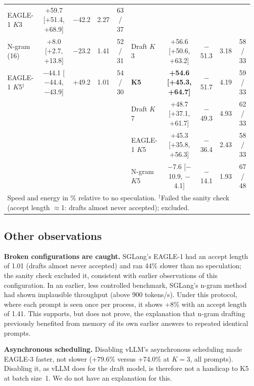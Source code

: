 \documentclass[conference]{IEEEtran}
\begin{document}
\begin{table}[t]
{\begin{tabular}{lcccc@{\hskip 18pt}lcccc}
EAGLE-1 $K$3 & +59.7 [+51.4, +68.9] & $-$42.2 & 2.27 & 63 / 37 \\
N-gram (16) & +8.0 [+2.7, +13.8] & $-$23.2 & 1.41 & 52 / 31 &
Draft $K$3 & +56.6 [+50.6, +63.2] & $-$51.3 & 3.18 & 58 / 33 \\
EAGLE-1 $K$5$^\dagger$ & $-$44.1 [$-$44.4, $-$43.9] & +49.2 & 1.01 & 54 / 30 &
\textbf{K5} & \textbf{+54.6 [+45.3, +64.7]} & $-$51.7 & 4.19 & 59 / 33 \\
 & & & & &
Draft $K$7 & +48.7 [+37.1, +61.7] & $-$49.3 & 4.93 & 62 / 33 \\
 & & & & &
EAGLE-1 $K$5 & +45.3 [+35.8, +56.3] & $-$36.4 & 2.43 & 58 / 33 \\
 & & & & &
N-gram $K$5 & $-$7.6 [$-$10.9, $-$4.1] & $-$14.1 & 1.93 & 67 / 48 \\
\bottomrule
\multicolumn{10}{l}{\footnotesize Speed and energy in \% relative to no speculation.
$^\dagger$Failed the sanity check (accept length $\approx$1: drafts almost never accepted); excluded.}
\end{tabular}}
\end{table}

\subsection{Other observations}
\label{sec:results-other}

\textbf{Broken configurations are caught.} SGLang's EAGLE-1 had an accept
length of 1.01 (drafts almost never accepted) and ran 44\% slower than no
speculation; the sanity check excluded it, consistent with earlier
observations of this configuration. In an earlier, less controlled
benchmark, SGLang's n-gram method had shown implausible throughput (above
900 tokens/s). Under this protocol, where each prompt is seen once per
process, it shows +8\% with an accept length of 1.41. This supports, but
does not prove, the explanation that n-gram drafting previously benefited
from memory of its own earlier answers to repeated identical prompts.

\textbf{Asynchronous scheduling.} Disabling vLLM's asynchronous scheduling
made EAGLE-3 faster, not slower (+79.6\% versus +74.0\% at $K{=}3$, all
prompts). Disabling it, as vLLM does for the draft model, is therefore not
a handicap to K5 at batch size~1. We do not have an explanation for this.
\end{document}
